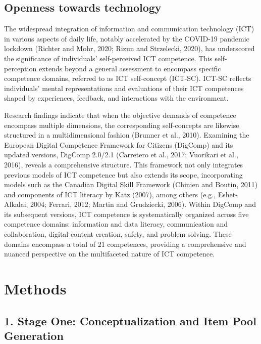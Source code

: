 \documentclass[
  12pt,
  a4paper,
  twoside]{article}
\begin{document}
\hypertarget{openness-towards-technology}{%
\subsection{Openness towards technology}\label{openness-towards-technology}}

The widespread integration of information and communication technology (ICT) in various aspects of daily life, notably accelerated by the COVID-19 pandemic lockdown (Richter and Mohr, 2020; Rizun and Strzelecki, 2020), has underscored the significance of individuals' self-perceived ICT competence. This self-perception extends beyond a general assessment to encompass specific competence domains, referred to as ICT self-concept (ICT-SC). ICT-SC reflects individuals' mental representations and evaluations of their ICT competences shaped by experiences, feedback, and interactions with the environment.

Research findings indicate that when the objective demands of competence encompass multiple dimensions, the corresponding self-concepts are likewise structured in a multidimensional fashion (Brunner et al., 2010). Examining the European Digital Competence Framework for Citizens (DigComp) and its updated versions, DigComp 2.0/2.1 (Carretero et al., 2017; Vuorikari et al., 2016), reveals a comprehensive structure. This framework not only integrates previous models of ICT competence but also extends its scope, incorporating models such as the Canadian Digital Skill Framework (Chinien and Boutin, 2011) and components of ICT literacy by Katz (2007), among others (e.g., Eshet-Alkalai, 2004; Ferrari, 2012; Martin and Grudziecki, 2006).
Within DigComp and its subsequent versions, ICT competence is systematically organized across five competence domains: information and data literacy, communication and collaboration, digital content creation, safety, and problem-solving. These domains encompass a total of 21 competences, providing a comprehensive and nuanced perspective on the multifaceted nature of ICT competence.

\hypertarget{methods}{%
\section{Methods}\label{methods}}

\hypertarget{stage-one-conceptualization-and-item-pool-generation}{%
\subsection{1. Stage One: Conceptualization and Item Pool Generation}\label{stage-one-conceptualization-and-item-pool-generation}}
\end{document}
